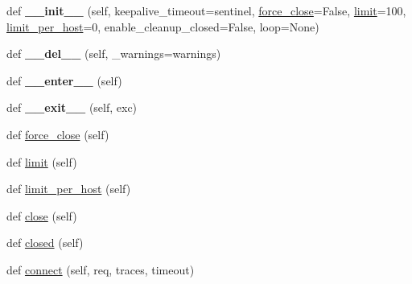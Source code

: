 \begin{DoxyCompactItemize}
\item 
\mbox{\label{classaiohttp_1_1connector_1_1_base_connector_a695e05484ed0f7f4e51e931af4d1ca01}} 
def {\bfseries \+\_\+\+\_\+init\+\_\+\+\_\+} (self, keepalive\+\_\+timeout=sentinel, \hyperlink{classaiohttp_1_1connector_1_1_base_connector_ae732f0e680ae1c5d35c57417a5cd9c4e}{force\+\_\+close}=False, \hyperlink{classaiohttp_1_1connector_1_1_base_connector_a9ae454fca119e032ccf66cb4745f4fbe}{limit}=100, \hyperlink{classaiohttp_1_1connector_1_1_base_connector_adce24e0088f2017dcc7338b65a708f04}{limit\+\_\+per\+\_\+host}=0, enable\+\_\+cleanup\+\_\+closed=False, loop=None)
\item 
\mbox{\label{classaiohttp_1_1connector_1_1_base_connector_a0f12418824e391d673b635def793739c}} 
def {\bfseries \+\_\+\+\_\+del\+\_\+\+\_\+} (self, \+\_\+warnings=warnings)
\item 
\mbox{\label{classaiohttp_1_1connector_1_1_base_connector_a04b0dcb48eac3b43415e679a17e6f8e4}} 
def {\bfseries \+\_\+\+\_\+enter\+\_\+\+\_\+} (self)
\item 
\mbox{\label{classaiohttp_1_1connector_1_1_base_connector_a9bf75af92afa1d006180270224df45bd}} 
def {\bfseries \+\_\+\+\_\+exit\+\_\+\+\_\+} (self, exc)
\item 
def \hyperlink{classaiohttp_1_1connector_1_1_base_connector_ae732f0e680ae1c5d35c57417a5cd9c4e}{force\+\_\+close} (self)
\item 
def \hyperlink{classaiohttp_1_1connector_1_1_base_connector_a9ae454fca119e032ccf66cb4745f4fbe}{limit} (self)
\item 
def \hyperlink{classaiohttp_1_1connector_1_1_base_connector_adce24e0088f2017dcc7338b65a708f04}{limit\+\_\+per\+\_\+host} (self)
\item 
def \hyperlink{classaiohttp_1_1connector_1_1_base_connector_abee47311f998049bf175922c24941be0}{close} (self)
\item 
def \hyperlink{classaiohttp_1_1connector_1_1_base_connector_a25be9f73d8222bad85a80d99589ec531}{closed} (self)
\item 
def \hyperlink{classaiohttp_1_1connector_1_1_base_connector_adee1e99f0a32023d21997dcdee945489}{connect} (self, req, traces, timeout)
\end{DoxyCompactItemize}
